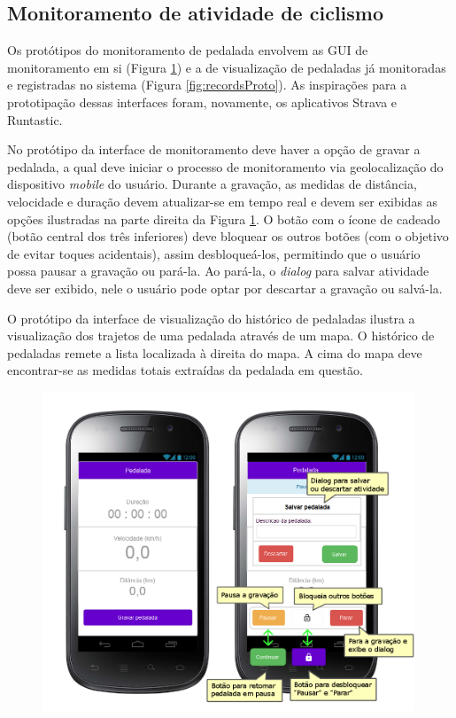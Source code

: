 \subsection{Monitoramento de atividade de ciclismo}
Os protótipos do monitoramento de pedalada envolvem as GUI de monitoramento em si (Figura \ref{fig:trackProto}) e a de visualização de pedaladas já monitoradas e registradas no sistema (Figura \ref{fig:recordsProto}). As inspirações para a prototipação dessas interfaces foram, novamente, os aplicativos Strava e Runtastic. 
\par
No protótipo da interface de monitoramento deve haver a opção de gravar a pedalada, a qual deve iniciar o processo de monitoramento via geolocalização do dispositivo \textit{mobile} do usuário. Durante a gravação, as medidas de distância, velocidade e duração devem atualizar-se em tempo real e devem ser exibidas as opções ilustradas na parte direita da Figura \ref{fig:trackProto}. O botão com o ícone de cadeado (botão central dos três inferiores) deve bloquear os outros botões (com o objetivo de evitar toques acidentais), assim desbloqueá-los, permitindo que o usuário possa pausar a gravação ou pará-la. Ao pará-la, o \textit{dialog} para salvar atividade deve ser exibido, nele o usuário pode optar por descartar a gravação ou salvá-la.
\par
O protótipo da interface de visualização do histórico de pedaladas ilustra a visualização dos trajetos de uma pedalada através de um mapa. O histórico de pedaladas remete a lista localizada à direita do mapa. A cima do mapa deve encontrar-se as medidas totais extraídas da pedalada em questão. 

\begin{figure}
\begin{minipage}{1.0\textwidth}
    \centerline{\includegraphics[width=30em]{figuras/Monitoramento.png}}
    \label{fig:trackProto}
\end{minipage}
\end{figure}

